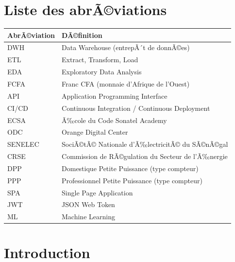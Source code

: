\documentclass[12pt,a4paper]{report}
\begin{document}
\listoffigures
{}
\newpage

\listoftables
{}
\newpage

\chapter*{Liste des abrÃ©viations}

\begin{tabular}{ll}
\toprule
\textbf{AbrÃ©viation} & \textbf{DÃ©finition} \\
\midrule
DWH   & Data Warehouse (entrepÃ´t de donnÃ©es) \\
ETL   & Extract, Transform, Load \\
EDA   & Exploratory Data Analysis \\
FCFA  & Franc CFA (monnaie d'Afrique de l'Ouest) \\
API   & Application Programming Interface \\
CI/CD & Continuous Integration / Continuous Deployment \\
ECSA  & Ã‰cole du Code Sonatel Academy \\
ODC   & Orange Digital Center \\
SENELEC & SociÃ©tÃ© Nationale d'Ã‰lectricitÃ© du SÃ©nÃ©gal \\
CRSE  & Commission de RÃ©gulation du Secteur de l'Ã‰nergie \\
DPP   & Domestique Petite Puissance (type compteur) \\
PPP   & Professionnel Petite Puissance (type compteur) \\
SPA   & Single Page Application \\
JWT   & JSON Web Token \\
ML    & Machine Learning \\
\bottomrule
\end{tabular}
\newpage

\chapter{Introduction}
\end{document}
